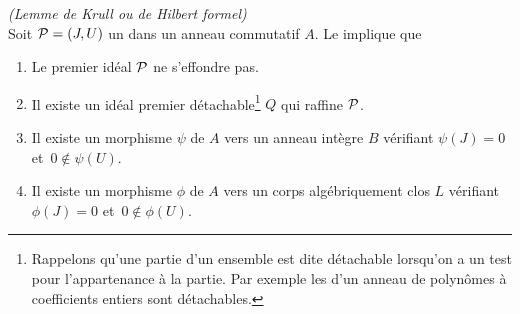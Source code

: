 \begin{corollary} 
\label{corNstformHilbert} {\em (Lemme de Krull ou \nst de Hilbert 
formel)} \\
Soit ${\cal P}=(J,U)$  un \proi dans un anneau commutatif $A$. Le \tcg implique 
que  \propeq
\begin{enumerate}
%
\item Le premier idéal ${\cal P}$ ne s'effondre pas.
%
\item Il existe un idéal premier détachable\footnote{Rappelons qu'une 
partie d'un ensemble est dite détachable lorsqu'on a un test pour 
l'appartenance à la partie. Par exemple les \itfs d'un anneau de 
polynômes à coefficients entiers sont détachables.} $Q$ qui raffine ${\cal P}$.
%
\item Il existe un morphisme $\psi$ de $A$ vers un anneau intègre $B$ 
vérifiant $\psi(J)=0$ \hbox{et $0\notin\psi(U)$}.
%
\item Il existe un morphisme $\phi$ de $A$ vers un corps algébriquement clos $L$ 
vérifiant $\phi(J)=0$ \hbox{et $0\notin\phi(U)$}.
\end{enumerate}
\end{corollary}
